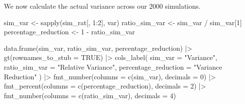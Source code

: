 \documentclass[
  letterpaper,
  DIV=11,
  numbers=noendperiod]{scrreprt}
\newenvironment{Shaded}{\begin{snugshade}}{\end{snugshade}}
\newcommand{\AttributeTok}[1]{\textcolor[rgb]{0.40,0.45,0.13}{#1}}
\newcommand{\ConstantTok}[1]{\textcolor[rgb]{0.56,0.35,0.01}{#1}}
\newcommand{\DecValTok}[1]{\textcolor[rgb]{0.68,0.00,0.00}{#1}}
\newcommand{\FunctionTok}[1]{\textcolor[rgb]{0.28,0.35,0.67}{#1}}
\newcommand{\NormalTok}[1]{\textcolor[rgb]{0.00,0.23,0.31}{#1}}
\newcommand{\OtherTok}[1]{\textcolor[rgb]{0.00,0.23,0.31}{#1}}
\newcommand{\SpecialCharTok}[1]{\textcolor[rgb]{0.37,0.37,0.37}{#1}}
\newcommand{\StringTok}[1]{\textcolor[rgb]{0.13,0.47,0.30}{#1}}
\renewcommand{\[}{\begin{equation}}
\renewcommand{\]}{\end{equation}}
\begin{document}
We now calculate the actual variance across our 2000 simulations.

\begin{Shaded}
\begin{Highlighting}[]
\NormalTok{sim\_var }\OtherTok{\textless{}{-}} \FunctionTok{sapply}\NormalTok{(sim\_rat[, }\DecValTok{1}\SpecialCharTok{:}\DecValTok{2}\NormalTok{], var)}
\NormalTok{ratio\_sim\_var }\OtherTok{\textless{}{-}}\NormalTok{ sim\_var }\SpecialCharTok{/}\NormalTok{ sim\_var[}\DecValTok{1}\NormalTok{]}
\NormalTok{percentage\_reduction }\OtherTok{\textless{}{-}} \DecValTok{1} \SpecialCharTok{{-}}\NormalTok{ ratio\_sim\_var}

\FunctionTok{data.frame}\NormalTok{(sim\_var, ratio\_sim\_var, percentage\_reduction) }\SpecialCharTok{|\textgreater{}} 
  \FunctionTok{gt}\NormalTok{(}\AttributeTok{rownames\_to\_stub =} \ConstantTok{TRUE}\NormalTok{) }\SpecialCharTok{|\textgreater{}} 
  \FunctionTok{cols\_label}\NormalTok{(}
    \AttributeTok{sim\_var =} \StringTok{"Variance"}\NormalTok{,}
    \AttributeTok{ratio\_sim\_var =} \StringTok{"Relative Variance"}\NormalTok{,}
    \AttributeTok{percentage\_reduction =} \StringTok{"Variance Reduction"}
\NormalTok{  ) }\SpecialCharTok{|\textgreater{}}
  \FunctionTok{fmt\_number}\NormalTok{(}\AttributeTok{columns =} \FunctionTok{c}\NormalTok{(sim\_var), }\AttributeTok{decimals =} \DecValTok{0}\NormalTok{) }\SpecialCharTok{|\textgreater{}} 
  \FunctionTok{fmt\_percent}\NormalTok{(}\AttributeTok{columns =} \FunctionTok{c}\NormalTok{(percentage\_reduction), }\AttributeTok{decimals =} \DecValTok{2}\NormalTok{) }\SpecialCharTok{|\textgreater{}}
  \FunctionTok{fmt\_number}\NormalTok{(}\AttributeTok{columns =} \FunctionTok{c}\NormalTok{(ratio\_sim\_var), }\AttributeTok{decimals =} \DecValTok{4}\NormalTok{)}
\end{Highlighting}
\end{Shaded}

\begin{table}

\caption{\label{tbl-agpop-ratio-variance-reduction}Simulated variance
and variance reduction: ratio estimator vs.~SRS}


\end{table}%
\end{document}
